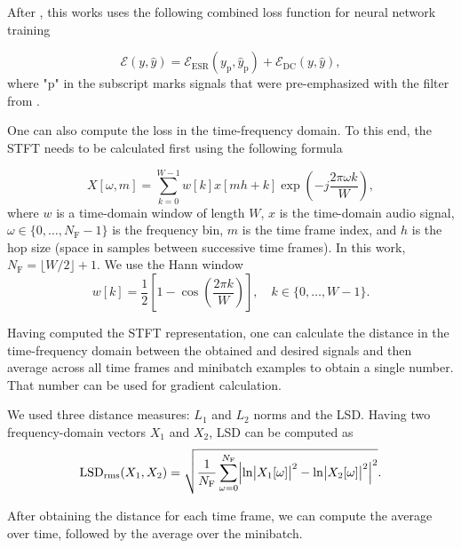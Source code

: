 After \cite{Wright2019a,Wright2020,Wright2019}, this works uses the following combined loss function for neural network training

\begin{equation}
  \mathcal{E}(y, \hat{y}) = \mathcal{E}_\text{ESR}(y_\text{p}, \hat{y}_\text{p}) + \mathcal{E}_\text{DC}(y, \hat{y}),
  \label{eq:final_loss_function}
\end{equation}
where "p" in the subscript marks signals that were pre-emphasized with the filter from .

One can also compute the loss in the time-frequency domain. To this end, the \ac{STFT} needs to be calculated first using the following formula \cite{Pytorch}

\begin{equation}
  X[\omega, m] = \sum \limits_{k=0}^{W-1} w[k] x[mh + k] \exp \left( -j\frac{2\pi \omega k}{W} \right),
\end{equation}
where $w$ is a time-domain window of length $W$, $x$ is the time-domain audio signal, $\omega \in \{0, \dots, N_\text{F}-1\}$ is the frequency bin, $m$ is the time frame index, and $h$ is the hop size (space in samples between successive time frames). In this work, $N_\text{F} = \lfloor W / 2 \rfloor + 1$. We use the Hann window \cite{Oppenheim2010}
\begin{equation}
  w[k] = \frac{1}{2} \left[ 1 - \cos \left( \frac{2\pi k}{W} \right) \right], \quad k \in \{0, \dots, W-1\}.
\end{equation}

Having computed the \ac{STFT} representation, one can calculate the distance in the time-frequency domain between the obtained and desired signals and then average across all time frames and minibatch examples to obtain a single number. That number can be used for gradient calculation.

We used three distance measures: $L_1$ and $L_2$ norms and the \acf{LSD}. Having two frequency-domain vectors $X_1$ and $X_2$, \ac{LSD} can be computed as \cite{Gray1976}
\begin{equation}
  \text{LSD}_\text{rms}(X_1, X_2) = \sqrt{ \frac{1}{N_\text{F}} \sum \limits_{\omega=0}^{N_\text{F}} \Bigl\lvert \ln \bigl\lvert X_1[\omega]\bigr\rvert^2 - \ln \bigl\lvert X_2[\omega]\bigr\rvert^2 \Bigr\rvert^2}.
  \label{eq:log_spectral_distance}
\end{equation}

After obtaining the distance for each time frame, we can compute the average over time, followed by the average over the minibatch.

